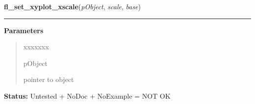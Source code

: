    \label{xformslib:library:fl_set_xyplot_xscale}

    \vspace{0.5ex}

\hspace{.8\funcindent}\begin{boxedminipage}{\funcwidth}

    \raggedright \textbf{fl\_set\_xyplot\_xscale}(\textit{pObject}, \textit{scale}, \textit{base})

    \vspace{-1.5ex}

    \rule{\textwidth}{0.5\fboxrule}
\setlength{\parskip}{2ex}
\setlength{\parskip}{1ex}
      \textbf{Parameters}
      \vspace{-1ex}

      \begin{quote}
        \begin{Ventry}{xxxxxxx}

          \item[pObject]

          pointer to object

        \end{Ventry}

      \end{quote}

\textbf{Status:} Untested + NoDoc + NoExample = NOT OK



    \end{boxedminipage}

    \label{xformslib:library:fl_set_xyplot_yscale}

    \vspace{0.5ex}

